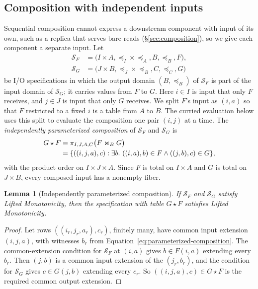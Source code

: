 \documentclass[sigconf]{cidr-2027}
\newtheorem{lemma}{Lemma}
\theoremstyle{remark}
\newcommand{\indesc}{input extension\xspace} %
\newcommand{\outrelpart}{extending\xspace}    %
\newcommand{\outnoun}{output extension\xspace}%
\newcommand{\Spec}{\mathcal{S}}
\newcommand{\spectype}[1][]{I/O specification#1\xspace}
\begin{document}
\subsection{Composition with independent inputs}
\label{sec:parameterized-composition}

\color{blue!70!black}Sequential composition cannot express a downstream component with input of
its own, such as a replica that serves bare reads
(\S\ref{sec:composition}), so we give each component a separate
input.  Let
\begin{align*}
  \Spec_F&=\bigl(I\times A,\preceq_I\times\preceq_A,B,\preceq_B,F\bigr),\\
  \Spec_G&=\bigl(J\times B,\preceq_J\times\preceq_B,C,\preceq_C,G\bigr)
\end{align*}
be \spectype[s] in which the output domain $(B,\preceq_B)$ of $\Spec_F$ is
part of the input domain of $\Spec_G$; it carries values from $F$ to $G$.  Here $i\in I$ is input
that only $F$ receives, and $j\in J$ is input that only $G$ receives.  We
split $F$'s input as $(i,a)$ so that $F$ restricted to a fixed $i$ is a table
from $A$ to $B$.  The curried evaluation below uses this split to evaluate
the composition one pair $(i,j)$ at a time.  The \emph{independently
parameterized composition} of $\Spec_F$ and $\Spec_G$ is
\begin{align}
  G\star F
  &=\pi_{I,J,A,C}\bigl(F\Join_{B}G\bigr) \notag\\
  &=\{((i,j,a),c):\exists b.\ ((i,a),b)\in F
                         \land ((j,b),c)\in G\},
  \label{eq:parameterized-composition}
\end{align}
with the product order on $I\times J\times A$.  Since $F$ is total on
$I\times A$ and $G$ is total on $J\times B$, every composed input has a
nonempty fiber.\color{black}

\begin{lemma}[Independently parameterized composition]
\label{lem:parameterized-composition}
If $\Spec_F$ and $\Spec_G$ satisfy Lifted Monotonicity, then the specification
with table $G\star F$ satisfies Lifted Monotonicity.
\end{lemma}

\begin{proof}
Let rows $((i_r,j_r,a_r),c_r)$, finitely many, have common \indesc $(i,j,a)$,
with witnesses $b_r$ from Equation~\ref{eq:parameterized-composition}.  The
common-extension condition for $\Spec_F$ at $(i,a)$ gives $b\in F(i,a)$
\outrelpart every $b_r$.  Then $(j,b)$ is a common \indesc of the
$(j_r,b_r)$, and the condition for $\Spec_G$ gives $c\in G(j,b)$ \outrelpart
every $c_r$.  So $((i,j,a),c)\in G\star F$ is the required common \outnoun.
\end{proof}
\end{document}
